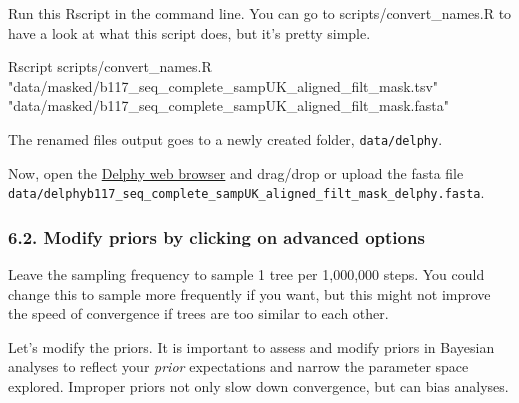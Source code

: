 \documentclass[
]{book}
\newenvironment{Shaded}{\begin{snugshade}}{\end{snugshade}}
\newcommand{\ExtensionTok}[1]{#1}
\newcommand{\NormalTok}[1]{#1}
\newcommand{\StringTok}[1]{\textcolor[rgb]{0.31,0.60,0.02}{#1}}
\begin{document}
Run this Rscript in the command line. You can go to scripts/convert\_names.R to have a look at what this script does, but it's pretty simple.

\begin{Shaded}
\begin{Highlighting}[]
\ExtensionTok{Rscript}\NormalTok{ scripts/convert\_names.R }\StringTok{"data/masked/b117\_seq\_complete\_sampUK\_aligned\_filt\_mask.tsv"} \StringTok{"data/masked/b117\_seq\_complete\_sampUK\_aligned\_filt\_mask.fasta"}
\end{Highlighting}
\end{Shaded}

The renamed files output goes to a newly created folder, \texttt{data/delphy}.

Now, open the \href{delphy.fathom.info}{Delphy web browser} and drag/drop or upload the fasta file \texttt{data/delphyb117\_seq\_complete\_sampUK\_aligned\_filt\_mask\_delphy.fasta}.

\subsubsection{6.2. Modify priors by clicking on advanced options}\label{modify-priors-by-clicking-on-advanced-options}

Leave the sampling frequency to sample 1 tree per 1,000,000 steps. You could change this to sample more frequently if you want, but this might not improve the speed of convergence if trees are too similar to each other.

Let's modify the priors. It is important to assess and modify priors in Bayesian analyses to reflect your \emph{prior} expectations and narrow the parameter space explored. Improper priors not only slow down convergence, but can bias analyses.
\end{document}
